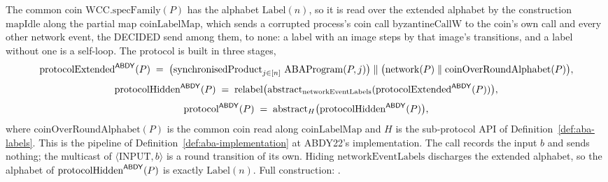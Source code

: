\begin{definition}
  \label{def:aba-protocol}
  \leanok
  The common coin $\mathrm{WCC.specFamily}(P)$ has the alphabet $\mathrm{Label}(n)$, so it is read over the extended alphabet by the construction $\mathrm{mapIdle}$ along the partial map $\mathrm{coinLabelMap}$, which sends a corrupted process's coin call $\mathrm{byzantineCallW}$ to the coin's own call and every other network event, the DECIDED send among them, to none: a label with an image steps by that image's transitions, and a label without one is a self-loop.
  The protocol is built in three stages,
  \[
    \abdy{\mathrm{protocolExtended}}(P) \;=\;
      \bigl(\mathrm{synchronisedProduct}_{j \in [n]}\ \mathrm{ABAProgram}(P,j)\bigr)
        \parallel \bigl(\mathrm{network}(P) \parallel \mathrm{coinOverRoundAlphabet}(P)\bigr),
  \]
  \[
    \mathrm{protocolHidden}^{\mathsf{ABDY}}(P) \;=\;
      \mathrm{relabel}\bigl(
        \mathrm{abstract}_{\mathrm{networkEventLabels}}(\mathrm{protocolExtended}^{\mathsf{ABDY}}(P))\bigr),
  \]
  \[
    \mathrm{protocol}^{\mathsf{ABDY}}(P) \;=\; \mathrm{abstract}_H\bigl(\mathrm{protocolHidden}^{\mathsf{ABDY}}(P)\bigr),
  \]
  where $\mathrm{coinOverRoundAlphabet}(P)$ is the common coin read along $\mathrm{coinLabelMap}$ and $H$ is the sub-protocol API of Definition~\ref{def:aba-labels}.
  This is the pipeline of Definition~\ref{def:aba-implementation} at ABDY22's implementation.
  The call records the input $b$ and sends nothing; the multicast of $\langle \mathrm{INPUT}, b \rangle$ is a round transition of its own.
  Hiding $\mathrm{networkEventLabels}$ discharges the extended alphabet, so the alphabet of $\mathrm{protocolHidden}^{\mathsf{ABDY}}(P)$ is exactly $\mathrm{Label}(n)$.
  Full construction: .
\end{definition}
